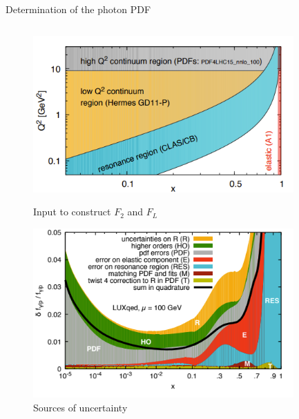 \documentclass[8pt,t]{beamer}
\begin{document}
\begin{frame}{Determination of the photon PDF}
\begin{columns}[T]
    \begin{column}{0.39\textwidth}
      \vspace*{-2.5em}
      \begin{figure}
        \includegraphics[width=0.89\textwidth]{figures/dataluxqed.png}
        \caption*{Input to construct $F_2$ and $F_L$}
        \includegraphics[width=0.89\textwidth]{figures/luxQED_uncs.png}
        \caption*{Sources of uncertainty}
      \end{figure}
    \end{column}
  \end{columns}
\end{frame}
\end{document}
